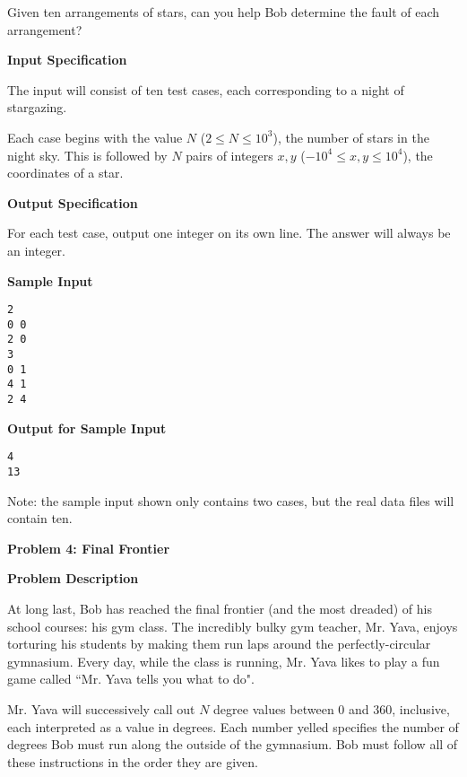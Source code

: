 \documentclass[11pt]{article}
\newcommand{\problem}[2]{\textbf{\Large Problem #1: #2} \vspace{0.4em}}
\newcommand{\heading}[1]{\vspace{0.6em} \textbf{#1}}
\begin{document}
Given ten arrangements of stars, can you help Bob determine the fault of each arrangement?


\heading{Input Specification}

The input will consist of ten test cases, each corresponding to a night of stargazing.

Each case begins with the value $N$ ($2 \le N \le 10^3$), the number of stars in the night sky. This is followed by $N$ pairs of integers $x, y$ ($-10^4 \le x, y \le 10^4$), the coordinates of a star.

\heading{Output Specification}

For each test case, output one integer on its own line. The answer will always be an integer.


\heading{Sample Input}
\vspace{-\topsep}
\begin{verbatim}
2
0 0
2 0
3
0 1
4 1
2 4
\end{verbatim}

\vspace{-\topsep}
\heading{Output for Sample Input}
\vspace{-\topsep}
\begin{verbatim}
4
13
\end{verbatim}

Note: the sample input shown only contains two cases, but the real data files will contain ten.


\pagebreak




\problem{4}{Final Frontier}


\heading{Problem Description}

At long last, Bob has reached the final frontier (and the most dreaded) of his school courses: his gym class. The incredibly bulky gym teacher, Mr. Yava, enjoys torturing his students by making them run laps around the perfectly-circular gymnasium. Every day, while the class is running, Mr. Yava likes to play a fun game called ``Mr. Yava tells you what to do".

Mr. Yava will successively call out $N$ degree values between 0 and 360, inclusive, each interpreted as a value in degrees. Each number yelled specifies the number of degrees Bob must run along the outside of the gymnasium. Bob must follow all of these instructions in the order they are given.
\end{document}
